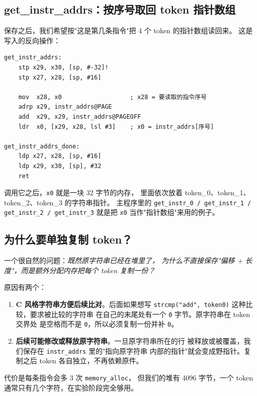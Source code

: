 \subsection{get\_instr\_addrs：按序号取回 token 指针数组}

保存之后，我们希望按"这是第几条指令"把 4 个 token 的指针数组读回来。
这是写入的反向操作：

\begin{lstlisting}[style=asm, caption=instr.s — get\_instr\_addrs]
get_instr_addrs:
    stp x29, x30, [sp, #-32]!
    stp x27, x28, [sp, #16]

    mov  x28, x0                   ; x28 = 要读取的指令序号
    adrp x29, instr_addrs@PAGE
    add  x29, x29, instr_addrs@PAGEOFF
    ldr  x0, [x29, x28, lsl #3]    ; x0 = instr_addrs[序号]

get_instr_addrs_done:
    ldp x27, x28, [sp, #16]
    ldp x29, x30, [sp], #32
    ret
\end{lstlisting}

调用它之后，\texttt{x0} 就是一块 32 字节的内存，
里面依次放着 token\_0、token\_1、token\_2、token\_3 的字符串指针。
主程序里的 \texttt{get\_instr\_0 / get\_instr\_1 / get\_instr\_2 / get\_instr\_3}
就是把 \texttt{x0} 当作"指针数组"来用的例子。

\subsection{为什么要单独复制 token？}

一个很自然的问题：\emph{既然原字符串已经在堆里了，
为什么不直接保存"偏移 + 长度"，而是额外分配内存把每个 token 复制一份？}

原因有两个：

\begin{enumerate}
    \item \textbf{C 风格字符串方便后续比对}。后面如果想写
        \texttt{strcmp("add", token0)} 这种比较，要求被比较的字符串
        在自己的末尾处有一个 \texttt{0} 字节。原字符串在 token 交界处
        是空格而不是 \texttt{0}，所以必须复制一份并补 \texttt{0}。
    \item \textbf{后续可能修改或释放原字符串}。一旦原字符串所在的行
        被释放或被覆盖，我们保存在 \texttt{instr\_addrs} 里的"指向原字符串
        内部的指针"就会变成野指针。复制之后 token 各自独立，不再依赖原件。
\end{enumerate}

代价是每条指令会多 3 次 \texttt{memory\_alloc}，
但我们的堆有 4096 字节，一个 token 通常只有几个字符，在实验阶段完全够用。
